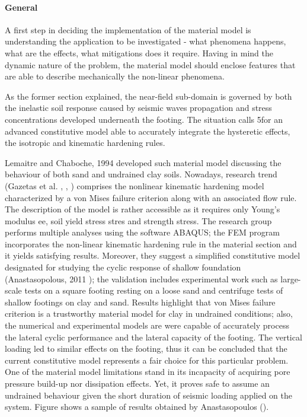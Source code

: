 \documentclass[11pt,a4paper]{report}
\begin{document}
\paragraph{General} A first step in deciding the implementation of the material model is understanding the application to be investigated - what phenomena happens, what are the effects, what mitigations does it require. Having in mind the dynamic nature of the problem, the material model should enclose features that are able to describe mechanically the non-linear phenomena. 

As the former section explained, the near-field sub-domain is governed by both the inelastic soil response caused by seismic waves propagation and stress concentrations developed underneath the footing. The situation calls 5for an advanced constitutive model able to accurately integrate the hysteretic effects, the isotropic and kinematic hardening rules.

Lemaitre and Chaboche, 1994 \cite{lemaitre1994mechanics} developed such material model discussing the behaviour of both sand and undrained clay soils. Nowadays, research trend (Gazetas et al. \cite{gazetas2004nonlinear}, \cite{gazetas2013nonlinear}, \cite{anastasopoulos2010soil}) comprises the nonlinear kinematic hardening model characterized by a von Mises failure criterion along with an associated flow rule. The description of the model is rather accessible as it requires only Young's modulus \gls{ee}, soil yield stress \gls{stres} and strength \gls{stress}. The research group performs multiple analyses using the software ABAQUS; the FEM program incorporates the non-linear kinematic hardening rule in the material section and it yields satisfying results. Moreover, they suggest a simplified constitutive model designated for studying the cyclic response of shallow foundation (Anastasopolous, 2011 \cite{anastasopoulos2011simplified}); the validation includes experimental work such as large-scale tests on a square footing resting on a loose sand and centrifuge tests of shallow footings on clay and sand. Results highlight that von Mises failure criterion is a trustworthy material model for clay in undrained conditions; also, the numerical and experimental models are were capable of accurately process the lateral cyclic performance and the lateral capacity of the footing. The vertical loading led to similar effects on the footing, thus it can be concluded that the current constitutive model represents a fair choice for this particular problem. One of the material model limitations stand in its incapacity of acquiring pore pressure build-up nor dissipation effects. Yet, it proves safe to assume an undrained behaviour given the short duration of seismic loading applied on the system. Figure shows a sample of results obtained by Anastasopoulos (\cite{anastasopoulos2011simplified}).
\end{document}
